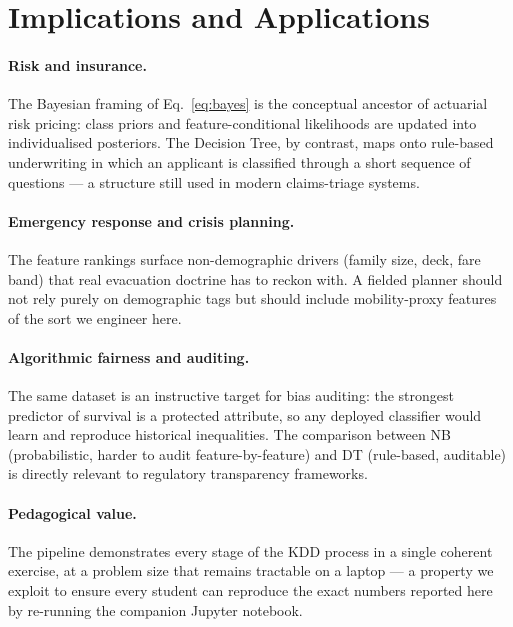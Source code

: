 \documentclass[10pt,a4paper,twocolumn]{article}
\begin{document}
\section{Implications and Applications}\label{sec:implications}

\paragraph{Risk and insurance.} The Bayesian framing of Eq.~\eqref{eq:bayes} is the
conceptual ancestor of actuarial risk pricing: class priors and feature-conditional
likelihoods are updated into individualised posteriors. The Decision Tree, by contrast,
maps onto rule-based underwriting in which an applicant is classified through a short
sequence of questions --- a structure still used in modern claims-triage systems.

\paragraph{Emergency response and crisis planning.} The feature rankings surface
non-demographic drivers (family size, deck, fare band) that real evacuation doctrine has
to reckon with. A fielded planner should not rely purely on demographic tags but should
include mobility-proxy features of the sort we engineer here.

\paragraph{Algorithmic fairness and auditing.} The same dataset is an instructive target
for bias auditing: the strongest predictor of survival is a protected attribute, so any
deployed classifier would learn and reproduce historical inequalities. The comparison
between NB (probabilistic, harder to audit feature-by-feature) and DT (rule-based,
auditable) is directly relevant to regulatory transparency frameworks.

\paragraph{Pedagogical value.} The pipeline demonstrates every stage of the KDD process
in a single coherent exercise, at a problem size that remains tractable on a laptop ---
a property we exploit to ensure every student can reproduce the exact numbers reported
here by re-running the companion Jupyter notebook.
\end{document}

